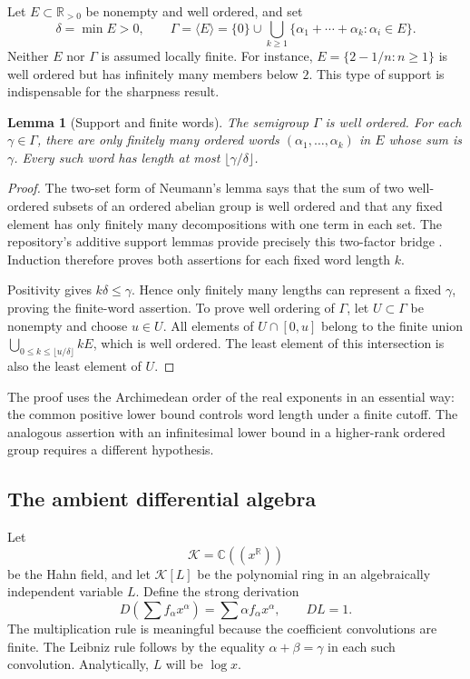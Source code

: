 \documentclass[11pt,a4paper]{article}
\numberwithin{equation}{section}
\newtheorem{lemma}[theorem]{Lemma}
\theoremstyle{definition}
\theoremstyle{remark}
\newcommand{\C}{\mathbb C}
\newcommand{\R}{\mathbb R}
\newcommand{\K}{\mathcal K}
\newcommand{\G}{\Gamma}
\begin{document}
Let $E\subset\R_{>0}$ be nonempty and well ordered, and set
\begin{equation}\label{eq:semigroup}
 \delta=\min E>0,\qquad
 \G=\langle E\rangle
  =\{0\}\cup\bigcup_{k\geq1}
       \{\alpha_1+\cdots+\alpha_k:\alpha_i\in E\}.
\end{equation}
Neither $E$ nor $\G$ is assumed locally finite. For instance,
$E=\{2-1/n:n\geq1\}$ is well ordered but has infinitely many members below
$2$. This type of support is indispensable for the sharpness result.

\begin{lemma}[Support and finite words]\label{lem:words}
The semigroup $\G$ is well ordered. For each $\gamma\in\G$, there are
only finitely many ordered words $(\alpha_1,\ldots,\alpha_k)$ in $E$ whose
sum is $\gamma$. Every such word has length at most
$\lfloor\gamma/\delta\rfloor$.
\end{lemma}
\begin{proof}
The two-set form of Neumann's lemma says that the sum of two well-ordered
subsets of an ordered abelian group is well ordered and that any fixed
element has only finitely many decompositions with one term in each set.
The repository's additive support lemmas provide precisely this two-factor
bridge \cite{repo-wellbased}. Induction therefore proves both assertions
for each fixed word length $k$.

Positivity gives $k\delta\leq\gamma$. Hence only finitely many lengths
can represent a fixed $\gamma$, proving the finite-word assertion.
To prove well ordering of $\G$, let $U\subset\G$ be nonempty and choose
$u\in U$. All elements of $U\cap[0,u]$ belong to the finite union
$\bigcup_{0\leq k\leq\lfloor u/\delta\rfloor}kE$, which is well ordered.
The least element of this intersection is also the least element of $U$.
\end{proof}

The proof uses the Archimedean order of the real exponents in an essential
way: the common positive lower bound controls word length under a finite
cutoff. The analogous assertion with an infinitesimal lower bound in a
higher-rank ordered group requires a different hypothesis.

\subsection{The ambient differential algebra}
Let
\[
 \K=\C((x^\R))
\]
be the Hahn field, and let $\K[L]$ be the polynomial ring in an
algebraically independent variable $L$. Define the strong derivation
\begin{equation}\label{eq:derivation}
 D\!\left(\sum f_\alpha x^\alpha\right)
   =\sum \alpha f_\alpha x^\alpha,\qquad DL=1.
\end{equation}
The multiplication rule is meaningful because the coefficient convolutions
are finite. The Leibniz rule follows by the equality
$\alpha+\beta=\gamma$ in each such convolution. Analytically, $L$ will be
$\log x$.
\end{document}
